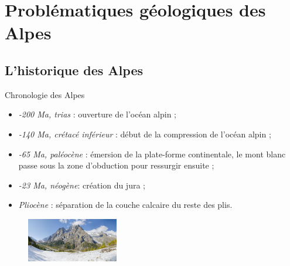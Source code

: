 \documentclass{beamer}
\begin{document}
\section{Problématiques géologiques des Alpes}

\subsection{L'historique des Alpes}
\begin{frame}{Chronologie des Alpes}
  \begin{itemize}
    \item \textit{-200 Ma, trias} : ouverture de l’océan alpin ;
    \item \textit{-140 Ma, crétacé inférieur} : début de la compression de l’océan alpin ;
    \item \textit{-65 Ma, paléocène} : émersion de la plate-forme continentale, le mont blanc passe sous la zone d'obduction pour ressurgir ensuite ;
    \item \textit{-23 Ma, néogène}: création du jura ;
    \item \textit{Pliocène} : séparation de la couche calcaire du reste des plis.
  \end{itemize}
  \begin{center}
    \begin{figure}
      \includegraphics[width=4cm]{Images/Images_Alexis/mont_blanc.jpg}
    \end{figure}
  \end{center}
\end{frame}
\end{document}
